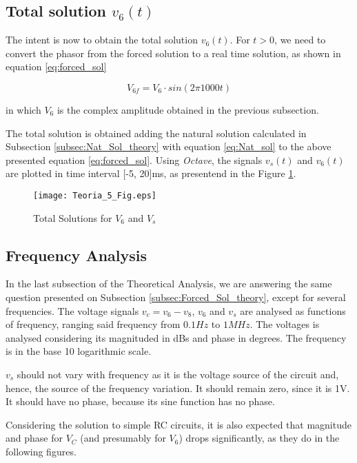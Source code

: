 \newpage

\subsection{Total solution $v_{6}(t)$}
\label{subsec:total_theory}

The intent is now to obtain the total solution $v_6(t)$. For $t>0$, we need to convert the phasor from the forced solution to a real time solution, as shown in equation \ref{eq:forced_sol}

\begin{equation}
  V_{6f} = V_6 \cdot sin(2 \pi 1000 t)
  \label{eq:forced_sol}
\end{equation}

in which $V_6$ is the complex amplitude obtained in the previous subsection.

The total solution is obtained adding the natural solution calculated in Subsection \ref{subsec:Nat_Sol_theory} with equation \ref{eq:Nat_sol} to the above presented equation \ref{eq:forced_sol}. Using \textit{Octave}, the signals $v_s(t)$ and $v_6(t)$ are plotted in time interval [-5, 20]ms, as presentend in the Figure \ref{plot5}.


\begin{figure}[!ht]
\centering
\texttt{[image: Teoria\_5\_Fig.eps]}
\caption{Total Solutions for $V_6$ and $V_s$}
\label{plot5}
\end{figure}

\subsection{Frequency Analysis}
\label{subsec:freq_theory}

In the last subsection of the Theoretical Analysis, we are answering the same question presented on Subsection \ref{subsec:Forced_Sol_theory}, except for several frequencies. The voltage signals $v_c = v_6 - v_8$, $v_6$ and $v_s$ are analysed as functions of frequency, ranging said frequency from $0.1 Hz$ to $1 MHz$. The voltages is analysed considering its magnituded in dBs and phase in degrees. The frequency is in the base 10 logarithmic scale. 

$v_s$ should not vary with frequency as it is the voltage source of the circuit and, hence, the source of the frequency variation. It should remain zero, since it is 1V. It should have no phase, because its sine function has no phase.

Considering the solution to simple RC circuits, it is also expected that magnitude and phase for $V_C$ (and presumably for $V_6$) drops significantly, as they do in the following figures.

